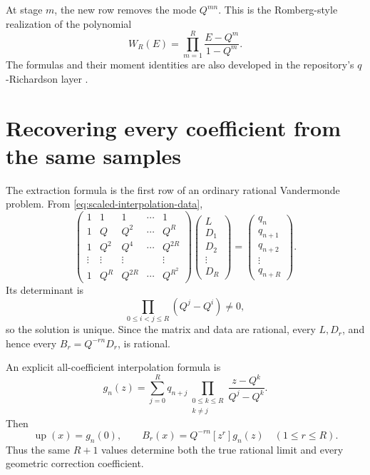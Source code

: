 \documentclass[11pt]{article}
\theoremstyle{definition}
\theoremstyle{remark}
\newcommand{\rv}{\operatorname{up}}
\newcommand{\D}{\mathrm D}
\begin{document}
At stage \(m\), the new row removes the mode \(Q^{mn}\).  This is the
Romberg-style realization of the polynomial
\begin{equation}
 W_R(E)=\prod_{m=1}^{R}\frac{E-Q^m}{1-Q^m}.
 \label{eq:filter-polynomial}
\end{equation}
The formulas and their moment identities are also developed in the repository's
\(q\)-Richardson layer \cite{proveit-frontiers}.

\section{Recovering every coefficient from the same samples}
\label{sec:all-coefficients}

The extraction formula is the first row of an ordinary rational Vandermonde
problem.  From \cref{eq:scaled-interpolation-data},
\begin{equation}
 \begin{pmatrix}
 1&1&1&\cdots&1\\
 1&Q&Q^2&\cdots&Q^R\\
 1&Q^2&Q^4&\cdots&Q^{2R}\\
 \vdots&\vdots&\vdots&&\vdots\\
 1&Q^R&Q^{2R}&\cdots&Q^{R^2}
 \end{pmatrix}
 \begin{pmatrix}L\\D_1\\D_2\\\vdots\\D_R\end{pmatrix}
 =
 \begin{pmatrix}q_n\\q_{n+1}\\q_{n+2}\\\vdots\\q_{n+R}\end{pmatrix}.
 \label{eq:Vandermonde-system}
\end{equation}
Its determinant is
\begin{equation}
 \prod_{0\le i<j\le R}(Q^j-Q^i)\ne0,
 \label{eq:Vandermonde-det}
\end{equation}
so the solution is unique.  Since the matrix and data are rational, every
\(L,D_r\), and hence every \(B_r=Q^{-rn}D_r\), is rational.

An explicit all-coefficient interpolation formula is
\begin{equation}
 g_n(z)=\sum_{j=0}^{R}q_{n+j}
 \prod_{\substack{0\le k\le R\\k\ne j}}
 \frac{z-Q^k}{Q^j-Q^k}.
 \label{eq:all-coefficient-Lagrange}
\end{equation}
Then
\begin{equation}
 \boxed{
 \rv(x)=g_n(0),\qquad
 B_r(x)=Q^{-rn}[z^r]g_n(z)\quad(1\le r\le R).}
 \label{eq:all-coefficients}
\end{equation}
Thus the same \(R+1\) values determine both the true rational limit and every
geometric correction coefficient.
\end{document}
